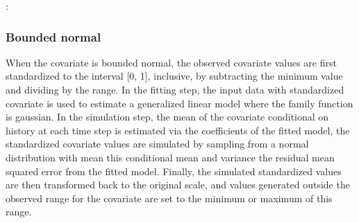 \documentclass[letterpaper,10pt,english]{sphinxmanual}
\begin{document}
\begin{sphinxVerbatim}[commandchars=\\\{\}]
        
         
      \PYG{p}{[} \PYG{p}{]}
      \PYG{p}{[} \PYG{p}{]}
       
      
\end{sphinxVerbatim}

\sphinxAtStartPar
{}:
\begin{quote}

\end{quote}


\subsubsection{Bounded normal}
\label{\detokenize{Specifications/Covariate model:bounded-normal}}
\sphinxAtStartPar
When the covariate is bounded normal, the observed covariate values are first standardized to the interval {[}0, 1{]}, inclusive,
by subtracting the minimum value and dividing by the range. In the fitting step, the input data with standardized covariate
is used to estimate a generalized linear model where the family function is gaussian. In the simulation step,
the mean of the covariate conditional on history at each time step is estimated via the coefficients of the
fitted model, the standardized covariate values are simulated by sampling from a normal distribution with mean this conditional mean and variance the
residual mean squared error from the fitted model. Finally, the simulated standardized values are then transformed back to the original scale,
and values generated outside the observed range for the covariate are set to the minimum or maximum of this range.
\end{document}
